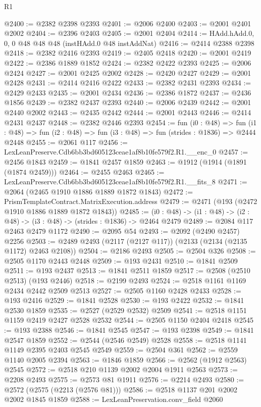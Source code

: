 \begin{lexlean}{R1}
\begin{coremodule}
@2400 := @2382 @2398 @2393
@2401 := @2006 @2400
@2403 := @2001 @2401 @2002
@2404 := @2396 @2403
@2405 := @2001 @2404
@2414 := HAdd.hAdd.{0, 0, 0} @48 @48 @48 (instHAdd.{0} @48 instAddNat)
@2416 := @2414 @2388 @2398
@2418 := @2382 @2416 @2393
@2419 := @2405 @2418
@2420 := @2001 @2419
@2422 := @2386 @1889 @1852
@2424 := @2382 @2422 @2393
@2425 := @2006 @2424
@2427 := @2001 @2425 @2002
@2428 := @2420 @2427
@2429 := @2001 @2428
@2431 := @2414 @2416 @2422
@2433 := @2382 @2431 @2393
@2434 := @2429 @2433
@2435 := @2001 @2434
@2436 := @2386 @1872
@2437 := @2436 @1856
@2439 := @2382 @2437 @2393
@2440 := @2006 @2439
@2442 := @2001 @2440 @2002
@2443 := @2435 @2442
@2444 := @2001 @2443
@2446 := @2414 @2431 @2437
@2448 := @2382 @2446 @2393
@2454 := fun (i0 : @48) =>
  fun (i1 : @48) => fun (i2 : @48) => fun (i3 : @48) => fun (strides : @1836) => @2444 @2448
@2455 := @2061 @117
@2456 := LexLeanPreserve.Cdb6bb3bd605123ceae1af8b10fe579f2.R1.__enc_0
@2457 := @2456 @1843
@2459 := @1841 @2457 @1859
@2463 := @1912 (@1914 (@1891 (@1874 @2459)))
@2464 := @2455 @2463
@2465 := LexLeanPreserve.Cdb6bb3bd605123ceae1af8b10fe579f2.R1.__fits_8
@2471 := @2064 (@2465 @1910 @1886 @1889 @1872 @1843)
@2472 := PrismTemplateContract.MatrixExecution.address
@2479 := @2471 (@193 (@2472 @1910 @1886 @1889 @1872 @1843))
@2485 := (i0 : @48) -> (i1 : @48) -> (i2 : @48) -> (i3 : @48) -> (strides : @1836) -> @2464 @2479
@2489 := @2084 @117 @2463 @2479 @1172
@2490 := @2095 @54
@2493 := @2092 (@2490 @2457) @2256
@2503 := @2489 @2493 (@2117 (@2127 @117)) (@2133 (@2134 (@2135 @1172) @2463 @2108))
@2504 := @2186 @2493
@2505 := @2504 @326
@2508 := @2505 @1170 @2443 @2448
@2509 := @193 @2431
@2510 := @1841 @2509
@2511 := @193 @2437
@2513 := @1841 @2511 @1859
@2517 := @2508 (@2510 @2513) (@193 @2446)
@2518 := @2199 @2493
@2524 := @2518 @1161 @1169 @2434 @2442 @2509 @2513
@2527 := @2505 @1160 @2428 @2433
@2528 := @193 @2416
@2529 := @1841 @2528
@2530 := @193 @2422
@2532 := @1841 @2530 @1859
@2535 := @2527 (@2529 @2532) @2509
@2541 := @2518 @1151 @1159 @2419 @2427 @2528 @2532
@2544 := @2505 @1150 @2404 @2418
@2545 := @193 @2388
@2546 := @1841 @2545
@2547 := @193 @2398
@2549 := @1841 @2547 @1859
@2552 := @2544 (@2546 @2549) @2528
@2558 := @2518 @1141 @1149 @2395 @2403 @2545 @2549
@2559 := @2504 @361
@2562 := @2559 @1140 @2005 @2394
@2563 := @1846 @1859
@2566 := @2562 (@1912 @2563) @2545
@2572 := @2518 @210 @1139 @2002 @2004 @1911 @2563
@2573 := @2208 @2493
@2575 := @2573 @81 @1911
@2576 := @2214 @2493
@2580 := @2572 (@2575 (@2213 (@2576 @81)))
@2586 := @2518 @1137 @201 @2002 @2002 @1845 @1859
@2588 := LexLeanPreservation.conv_field @2060

\end{coremodule}
\end{lexlean}
